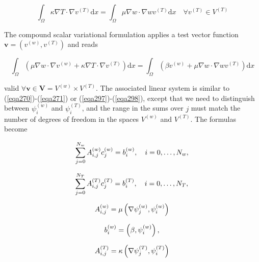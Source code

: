 \documentclass[../main.tex]{subfiles}
\begin{document}
		\begin{equation}
			\label{eqa289}
			\int_{\Omega} \kappa \nabla T \cdot \nabla v^{(T)} \mathrm{d} x=\int_{\Omega} \mu \nabla w \cdot \nabla w v^{(T)} \mathrm{d} x \quad \forall v^{(T)} \in V^{(T)}
		\end{equation}
	
		The compound scalar variational formulation applies a test vector function $\boldsymbol{v}=\left(v^{(w)}, v^{(T)}\right)$ and reads
		
		\begin{equation}
			\label{eqa290}
			\int_{\Omega}\left(\mu \nabla w \cdot \nabla v^{(w)}+\kappa \nabla T \cdot \nabla v^{(T)}\right) \mathrm{d} x=\int_{\Omega}\left(\beta v^{(w)}+\mu \nabla w \cdot \nabla w v^{(T)}\right) \mathrm{d} x
		\end{equation}
		
		\noindent valid $\forall \boldsymbol{v} \in \boldsymbol{V}=V^{(w)} \times V^{(T)}$.\smallbreak
		The associated linear system is similar to (\ref{eqa270})-(\ref{eqa271}) or (\ref{eqa297})-(\ref{eqa298}), except that we need to distinguish between $\psi_{i}^{(w)}$ and $\psi_{i}^{(T)}$, and the range in the sums over $j$ must match the number of degrees of freedom in the spaces $V^{(w)}$ and $V^{(T)}$. The formulas become
		
		\begin{equation}
			\label{eqa291}
			\sum_{j=0}^{N_{w}} A_{i, j}^{(w)} c_{j}^{(w)}=b_{i}^{(w)}, \quad i=0, \ldots, N_{w}, \\
		\end{equation}
		
		\begin{equation}
			\label{eqa292}
			\sum_{j=0}^{N_{T}} A_{i, j}^{(T)} c_{j}^{(T)}=b_{i}^{(T)}, \quad i=0, \ldots, N_{T}, \\
		\end{equation}
	
		\begin{equation}
			\label{eqa293}
			A_{i, j}^{(w)}=\mu\left(\nabla \psi_{j}^{(w)}, \psi_{i}^{(w)}\right) \\
		\end{equation}
	
		\begin{equation}
			\label{eqa294}
			b_{i}^{(w)}=\left(\beta, \psi_{i}^{(w)}\right), \\
		\end{equation}
	
		\begin{equation}
			\label{eqa295}
			A_{i, j}^{(T)}=\kappa\left(\nabla \psi_{j}^{(T)}, \psi_{i}^{(T)}\right) \\
		\end{equation}
	
\end{document}
